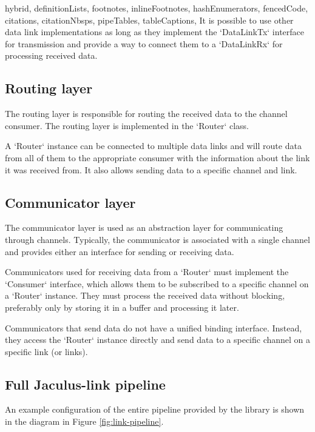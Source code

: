\begin{markdown*}{%
  hybrid,
  definitionLists,
  footnotes,
  inlineFootnotes,
  hashEnumerators,
  fencedCode,
  citations,
  citationNbsps,
  pipeTables,
  tableCaptions,
}
It is possible to use other data link implementations as long as they implement the `DataLinkTx` interface for transmission and provide a way to connect them to a `DataLinkRx` for processing received data.

\subsection{Routing layer}

The routing layer is responsible for routing the received data to the channel consumer. The routing layer is implemented in the `Router` class.

A `Router` instance can be connected to multiple data links and will route data from all of them to the appropriate consumer with the information about the link it was received from. It also allows sending data to a specific channel and link.

\subsection{Communicator layer}

The communicator layer is used as an abstraction layer for communicating through channels. Typically, the communicator is associated with a single channel and provides either an interface for sending or receiving data.

Communicators used for receiving data from a `Router` must implement the `Consumer` interface, which allows them to be subscribed to a specific channel on a `Router` instance. They must process the received data without blocking, preferably only by storing it in a buffer and processing it later.

Communicators that send data do not have a unified binding interface. Instead, they access the `Router` instance directly and send data to a specific channel on a specific link (or links).

\subsection{Full Jaculus-link pipeline}

An example configuration of the entire pipeline provided by the library is shown in the diagram in Figure \ref{fig:link-pipeline}.


\end{markdown*}
